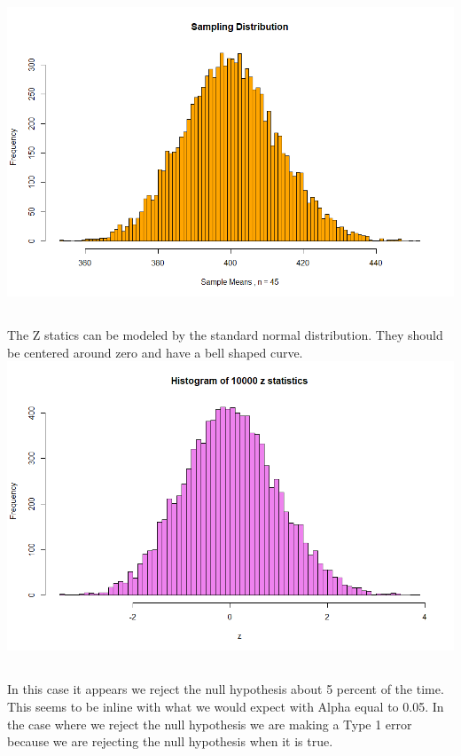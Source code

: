 \documentclass[letterpaper, onecolumn,10pt]{IEEEtran}
\begin{document}
                \includegraphics[width=\textwidth]{week4/Images/Rplot01.png}
                
            \subsection{}
                The Z statics can be modeled by the standard normal distribution. They should be centered around zero and have a bell shaped curve.\\
                
                \includegraphics[width=\textwidth]{week4/Images/Rplot02.png}
                
            \subsection{}
                In this case it appears we reject the null hypothesis about 5 percent of the time. This seems to be inline with what we would expect with Alpha equal to 0.05. In the case where we reject the null hypothesis we are making a Type 1 error because we are rejecting the null hypothesis when it is true.\\
            
\end{document}
